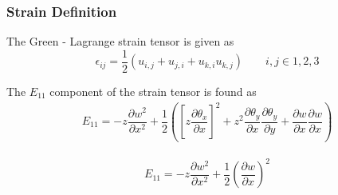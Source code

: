\documentclass[9pt]{beamer}
\begin{document}
\begin{frame}
\frametitle{Strain Definition}
The Green - Lagrange strain tensor is given as
\begin{equation*}
\epsilon_{ij} = \frac{1}{2} \left(  u_{i,j} +  u_{j,i} + u_{k,i}u_{k,j} \right) \qquad i,j \in 1,2,3
\end{equation*}


The $E_{11}$ component of the strain tensor is found as
\begin{align*}
E_{11} = -z \dfrac{\partial w^2 }{\partial x^2} + \dfrac{1}{2}\left(\left[z\dfrac{\partial \theta_x}{\partial x}\right] ^2 +z^2 \dfrac{\partial \theta_y}{\partial x}\dfrac{\partial \theta_y}{\partial y} + \dfrac{\partial w}{\partial x} \dfrac{\partial w}{\partial x}\right)
\end{align*}

\begin{align*}
E_{11} = -z \dfrac{\partial w^2 }{\partial x^2} + \dfrac{1}{2} \left( \dfrac{\partial w}{\partial x} \right)^2
\end{align*}
\end{frame}
\end{document}
